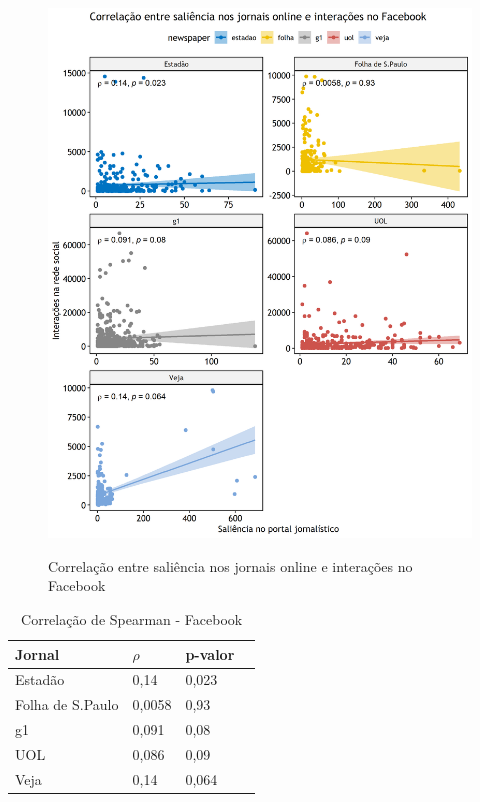 \documentclass[
	12pt,
	oneside,
	a4paper,
	english,
	brazil
]{abntex2ppgsi}
\begin{document}
\begin{figure}[H]
	\centering
 	  \caption{Correlação entre saliência nos jornais online e interações no Facebook}
		\includegraphics{facebook.png}
	\label{fig:correlacao-facebook}
\end{figure}

\begin{table}[H]
	\centering
	\caption{Correlação de Spearman - Facebook}
		\begin{tabular}{p{2in} p{1in} p{1in} p{1in} } \hline

		Jornal & $\rho$ & p-valor \\ \hline
		Estadão	& 0,14 & 0,023 \\ 
		Folha de S.Paulo & 0,0058 & 0,93 \\ 
		g1	& 0,091 & 0,08 \\ 
		UOL	& 0,086 & 0,09 \\ 
		Veja & 0,14 & 0,064 \\ \hline
		
		\end{tabular}
	\label{tab:correlacao-facebook}
\end{table}
\end{document}
